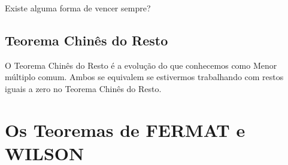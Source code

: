 Existe alguma forma de vencer sempre?


\subsection{Teorema Chinês do Resto}
O Teorema Chinês do Resto é a evolução do que conhecemos como Menor múltiplo comum. Ambos se equivalem se estivermos trabalhando com restos iguais a zero no Teorema Chinês do Resto.

\section{Os Teoremas de FERMAT e WILSON}




